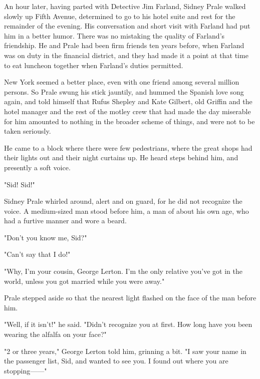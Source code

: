 \documentclass{novel}
\begin{document}
\begin{ChapterStart}
\vspace{3\nbs}
\end{ChapterStart}
    
An hour later, having parted with Detective Jim Farland, Sidney Prale walked slowly up Fifth Avenue, determined to go to his hotel suite and rest for the remainder of the evening. His conversation and short visit with Farland had put him in a better humor. There was no mistaking the quality of Farland's friendship. He and Prale had been firm friends ten years before, when Farland was on duty in the financial district, and they had made it a point at that time to eat luncheon together when Farland's duties permitted.

New York seemed a better place, even with one friend among several million persons. So Prale swung his stick jauntily, and hummed the Spanish love song again, and told himself that Rufus Shepley and Kate Gilbert, old Griffin and the hotel manager and the rest of the motley crew that had made the day miserable for him amounted to nothing in the broader scheme of things, and were not to be taken seriously.

He came to a block where there were few pedestrians, where the great shops had their lights out and their night curtains up. He heard steps behind him, and presently a soft voice.

"Sid! Sid!"

Sidney Prale whirled around, alert and on guard, for he did not recognize the voice. A medium-sized man stood before him, a man of about his own age, who had a furtive manner and wore a beard.

"Don't you know me, Sid?"

"Can't say that I do!"

"Why, I'm your cousin, George Lerton. I'm the only relative you've got in the world, unless you got married while you were away."

Prale stepped aside so that the nearest light flashed on the face of the man before him.

"Well, if it isn't!" he said. "Didn't recognize you at first. How long have you been wearing the alfalfa on your face?"

"2 or three years," George Lerton told him, grinning a bit. "I saw your name in the passenger list, Sid, and wanted to see you. I found out where you are stopping------"
\end{document}

